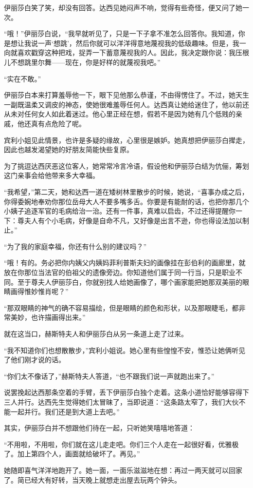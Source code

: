 \par 伊丽莎白笑了笑，却没有回答。达西见她闷声不响，觉得有些奇怪，便又问了她一次。
\par “哦！”伊丽莎白说，“我早就听见了，只是一下子拿不准怎么回答你。我知道，你是想让我说一声‘想跳’，然后你就可以洋洋得意地蔑视我的低级趣味。但是，我一向就喜欢戳穿这种把戏，捉弄一下蓄意蔑视我的人。因此，我决定跟你说：我压根儿不想跳里尔舞——现在，你是好样的就蔑视我吧。”
\par “实在不敢。”
\par 伊丽莎白本来打算羞辱他一下，眼下见他那么恭谨，不由得愣住了。不过，她天生一副既温柔又调皮的神态，使她很难羞辱任何人。达西真让她给迷住了，他以前还从未对任何女人如此着迷过。他心里正经在想，假若不是因为她有几个低贱的亲戚，他还真有点危险了呢。
\par 宾利小姐见此情景，也许是多疑的缘故，心里很是嫉妒。她真想把伊丽莎白撵走，因此也越发渴望她的好朋友简能快些复原。
\par 为了挑逗达西厌恶这位客人，她常常冷言冷语，假设他和伊丽莎白结为伉俪，筹划这门亲事会给他带来多大幸福。
\par “我希望，”第二天，她和达西一道在矮树林里散步的时候，她说，“喜事办成之后，你得委婉地奉劝你那位岳母大人不要多嘴多舌。你要是有能耐的话，也把你那几个小姨子追逐军官的毛病给治一治。还有一件事，真难以启齿，不过还得提醒你一下：尊夫人有个小毛病，好像是自命不凡，又好像是出言不逊，你也得设法加以制止。”
\par “为了我的家庭幸福，你还有什么别的建议吗？”
\par “哦！有的。务必把你内姨父内姨妈菲利普斯夫妇的画像挂在彭伯利的画廊里，就放在你那位当法官的伯祖父的遗像旁边。你知道他们属于同一行当，只是职业不同。至于尊夫人伊丽莎白，你就别找人给她画像了，哪个画家能把她那双美丽的眼睛画得惟妙惟肖呢？”
\par “那双眼睛的神气的确不容易描绘，但是眼睛的颜色和形状，以及那眼睫毛，都非常美妙，也许描画得出来。”
\par 就在这当口，赫斯特夫人和伊丽莎白从另一条道上走了过来。
\par “我不知道你们也想散散步，”宾利小姐说。她心里有些惶惶不安，惟恐让她俩听见了他们刚才说的话。
\par “你们太不像话了，”赫斯特夫人答道，“也不跟我们说一声就跑出来了。”
\par 说罢挽起达西那条空着的手臂，丢下伊丽莎白独个走着。这条小道恰好能够容得下三人并行。达西先生觉得她们太冒昧了，当即说道：“这条路太窄了，我们大伙不能一起并行。我们还是到大道上去吧。”
\par 其实，伊丽莎白并不想跟他们待在一起，只听她笑嘻嘻地答道：
\par “不用啦，不用啦，你们就在这儿走走吧。你们三个人走在一起很好看，优雅极了。加上第四个人，画面就给破坏了。再见。”
\par 她随即喜气洋洋地跑开了。她一面，一面乐滋滋地在想：再过一两天就可以回家了。简已经大有好转，当天晚上就想走出屋去玩两个钟头。


